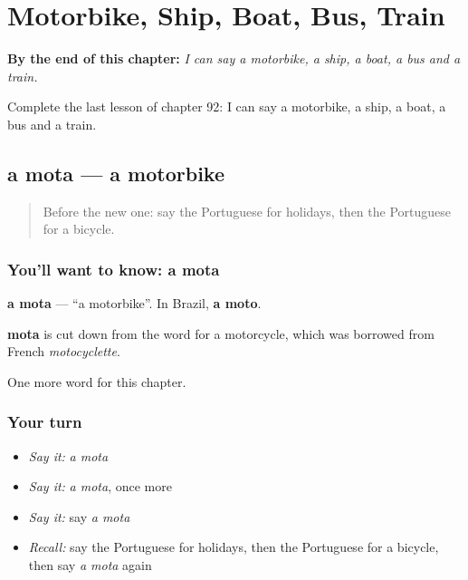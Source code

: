 
\chapter{Motorbike, Ship, Boat, Bus, Train}
\label{ch:pt-motorbike-ship-boat-bus-train}

\begin{chapteropening}
\textbf{By the end of this chapter:} \emph{I can say a motorbike, a ship, a boat, a bus and a train.}

Complete the last lesson of chapter 92: I can say a motorbike, a ship, a boat, a bus and a train.
\end{chapteropening}

\section[a mota]{a mota — a motorbike}

\label{lesson:PT-C92-mota}



\begin{quote}
Before the new one: say the Portuguese for holidays, then the Portuguese for a bicycle.
\end{quote}

\subsection*{You'll want to know: a mota}
\textbf{a mota} — \textquotedblleft{}a motorbike\textquotedblright{}. In Brazil, \textbf{a moto}.

\begin{cousinweb}
\textbf{mota} is cut down from the word for a motorcycle, which was borrowed from French \emph{motocyclette}.
\end{cousinweb}

\begin{grammarlens}[title={What you've built}]
One more word for this chapter.
\end{grammarlens}

\subsection*{Your turn}
\begin{itemize}
\raggedright
  \item \emph{Say it:} \emph{a mota}
  \item \emph{Say it:} \emph{a mota}, once more
  \item \emph{Say it:} say \emph{a mota}
  \item \emph{Recall:} say the Portuguese for holidays, then the Portuguese for a bicycle, then say \emph{a mota} again
\end{itemize}

